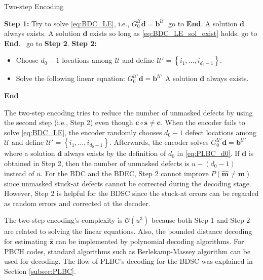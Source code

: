 \documentclass[10pt,twocolumn,twoside,submit]{JCNtran}
\begin{document}
	\begin{algorithm}
		\caption{Two-step Encoding}\label{alg:twostep}
		\begin{algorithmic}[]
			\State \textbf{Step 1:} Try to solve \eqref{eq:BDC_LE}, i.e., $G_0^{\mathcal{U}} {\mathbf{d}} = {\mathbf{b}}^{\mathcal{U}}$.	
			 go to \textbf{End}. \Comment A solution $\mathbf{d}$ always exists.
			\Else
			\Comment A solution ${\mathbf{d}}$ exists so long as \eqref{eq:BDC_LE_sol_exist} holds.
			 go to \textbf{End}.
			\Else ~go to \textbf{Step 2}.
			\EndIf
			\EndIf
			\State \textbf{Step 2:}
			\begin{itemize}
				\item Choose $d_0 - 1$ locations among $\mathcal{U}$ and define ${\mathcal{U}}' = \left\{i_1, \ldots, i_{d_0 - 1}\right\}$.
				\item Solve the following linear equation: $G_0^{\mathcal{U}'}{\mathbf{d}} = {\mathbf{b}}^{\mathcal{U}'}$ \qquad \qquad \Comment A solution $\mathbf{d}$ always exists.
			\end{itemize}
			\State \textbf{End}					
		\end{algorithmic}
	\end{algorithm}		
	
	The two-step encoding tries to reduce the number of unmasked defects by using the second step (i.e., Step 2) even though $\mathbf{c} \circ \mathbf{s} \ne \mathbf{c}$. When the encoder fails to solve \eqref{eq:BDC_LE}, the encoder randomly chooses $d_0 - 1$ defect locations among $\mathcal{U}$ and define ${\mathcal{U}}' = \left\{i_1, \ldots, i_{d_0 - 1}\right\}$. Afterwards, the encoder solves $G_0^{\mathcal{U}'}{\mathbf{d}} = {\mathbf{b}}^{\mathcal{U}'}$ where a solution $\mathbf{d}$ always exists by the definition of $d_0$ in \eqref{eq:PLBC_d0}. If $\mathbf{d}$ is obtained in Step 2, then the number of unmasked defects is $u - \left(d_0 - 1 \right)$ instead of $u$. For the BDC and the BDEC, Step 2 cannot improve $P(\widehat{\mathbf{m}} \ne \mathbf{m})$ since unmasked stuck-at defects cannot be corrected during the decoding stage. However, Step 2 is helpful for the BDSC since the stuck-at errors can be regarded as random errors and corrected at the decoder.  
			
	The two-step encoding's complexity is ${\mathcal{O}}\left( u^3\right)$ because both Step 1 and Step 2 are related to solving the linear equations. Also, the bounded distance decoding for estimating $\widehat{\mathbf{z}}$ can be implemented by polynomial decoding algorithms. For PBCH codes, standard algorithms such as Berlekamp-Massey algorithm can be used for decoding. The flow of PLBC's decoding for the BDSC was explained in Section \ref{subsec:PLBC}. 
\end{document}
